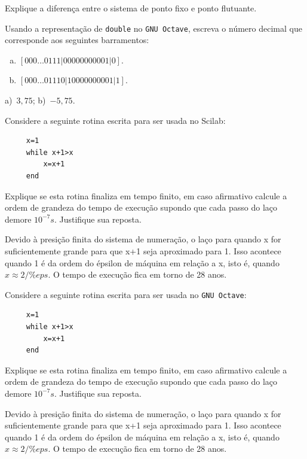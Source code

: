 \begin{exer} 
  Explique a diferença entre o sistema de ponto fixo e ponto flutuante.
\end{exer}


\ifisoctave
\begin{exer}
  Usando a representação de \verb+double+ no \verb+GNU Octave+, escreva o número decimal que corresponde aos seguintes barramentos:
  \begin{enumerate}[a)]
  \item $[000\ldots 0111|00000000001|0]$.
  \item $[000\ldots 01110|10000000001|1]$.
  \end{enumerate}
\end{exer}
\begin{resp}
  a)~$3,75$; b)~$-5,75$.
\end{resp}
\fi


\ifisscilab
\begin{exer}Considere a seguinte rotina escrita para ser usada no Scilab:
 \begin{verbatim}
     x=1
     while x+1>x
         x=x+1
     end
 \end{verbatim}
 Explique se esta rotina finaliza em tempo finito, em caso afirmativo calcule a ordem de grandeza do tempo de execução supondo que cada passo do laço demore $10^{-7}s$. Justifique sua reposta.
 \end{exer}
\begin{resp}
 Devido à presição finita do sistema de numeração, o laço para quando x for suficientemente grande para que x+1 seja aproximado para 1. Isso acontece quando 1 é da ordem do épsilon de máquina em relação a x, isto é, quando $x\approx 2/\%eps$. O tempo de execução fica em torno de 28 anos.
\end{resp}

 \fi



\ifisoctave
\begin{exer}Considere a seguinte rotina escrita para ser usada no \verb+GNU Octave+:
 \begin{verbatim}
     x=1
     while x+1>x
         x=x+1
     end
 \end{verbatim}
 Explique se esta rotina finaliza em tempo finito, em caso afirmativo calcule a ordem de grandeza do tempo de execução supondo que cada passo do laço demore $10^{-7}s$. Justifique sua reposta.
 \end{exer}
\begin{resp}
 Devido à presição finita do sistema de numeração, o laço para quando x for suficientemente grande para que x+1 seja aproximado para 1. Isso acontece quando 1 é da ordem do épsilon de máquina em relação a x, isto é, quando $x\approx 2/\%eps$. O tempo de execução fica em torno de 28 anos.
\end{resp}
 \fi

